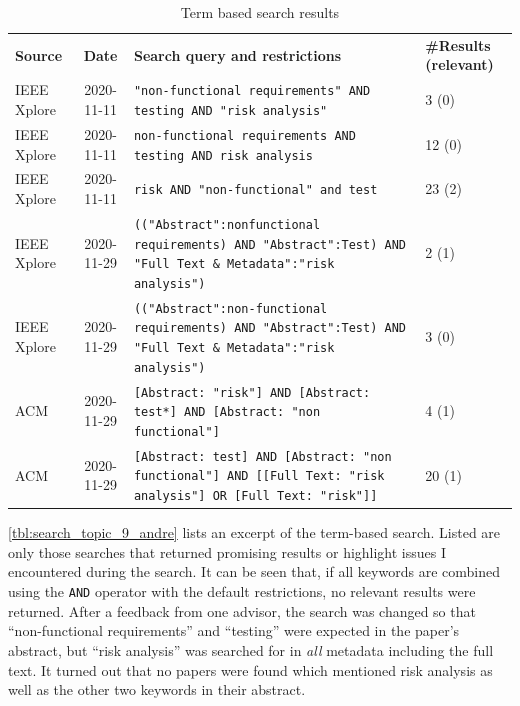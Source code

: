 \begin{small}
	\centering
	\begin{longtable}[h]{p{}|c|p{}|p{}}
		\caption{Term based search results}
		\label{tbl:search_topic_9_andre}
		\setlength{\tabcolsep}{1em}\\    %
		\toprule
		\textbf{Source} & \textbf{Date} & \textbf{Search query and restrictions} & \textbf{\#Results (relevant)} \\
		
		\midrule
		IEEE Xplore & 2020-11-11 & \texttt{"{}non-functional requirements"{} AND testing AND "{}risk analysis"{}} & 3 (0) \\
		
		\midrule
		IEEE Xplore & 2020-11-11 & \texttt{non-functional requirements AND testing AND risk analysis} & 12 (0) \\
		
		\midrule
		IEEE Xplore & 2020-11-11 & \texttt{risk AND "non-functional" and test} & 23 (2) \\
		
		\midrule
		IEEE Xplore & 2020-11-29 & \texttt{(("{}Abstract"{}:nonfunctional requirements) AND "{}Abstract"{}:Test) AND "Full Text \& Metadata":"{}risk analysis"{})} & 2 (1) \\
		
		\midrule
		IEEE Xplore & 2020-11-29 & \texttt{(("{}Abstract"{}:non-functional requirements) AND "{}Abstract"{}:Test) AND "Full Text \& Metadata":"{}risk analysis"{})} & 3 (0) \\
		
		\midrule
		ACM & 2020-11-29 & \texttt{[Abstract: "{}risk"{}] AND [Abstract: test*] AND [Abstract: "{}non functional"{}]} & 4 (1) \\
		
		\midrule
		ACM & 2020-11-29 & \texttt{[Abstract: test] AND [Abstract: "{}non functional"{}] AND [[Full Text: "{}risk analysis"{}] OR [Full Text: "{}risk"{}]]} & 20 (1) \\
		\bottomrule
	\end{longtable}
\end{small}

\autoref{tbl:search_topic_9_andre} lists an excerpt of the term-based search.
Listed are only those searches that returned promising results or highlight issues I encountered during the search.
It can be seen that, if all keywords are combined using the \texttt{AND} operator with the default restrictions, no relevant results were returned.
After a feedback from one advisor, the search was changed so that \enquote{non-functional requirements} and \enquote{testing} were expected in the paper's abstract, but \enquote{risk analysis} was searched for in \textit{all} metadata including the full text.
It turned out that no papers were found which mentioned risk analysis as well as the other two keywords in their abstract.


